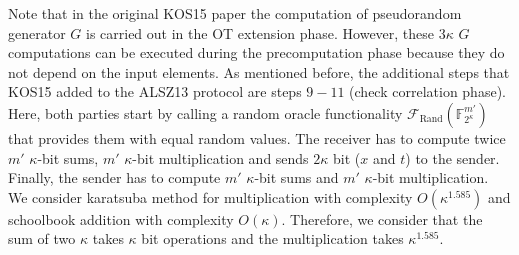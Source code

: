 Note that in the original KOS15 paper \cite{K15} the computation of pseudorandom generator $G$ is carried out in the OT extension phase. However, these $3\kappa$ $G$ computations can be executed during the precomputation phase because they do not depend on the input elements. As mentioned before, the additional steps that KOS15 added to the ALSZ13 protocol are steps $9-11$ (check correlation phase). Here, both parties start by calling a random oracle functionality $\mathcal{F}_{\text{Rand}}(\mathbb{F}^{m'}_{2^\kappa})$ that provides them with equal random values. The receiver has to compute twice $m'$ $\kappa$-bit sums, $m'$ $\kappa$-bit multiplication and sends $2\kappa$ bit ($x$ and $t$) to the sender. Finally, the sender has to compute $m'$ $\kappa$-bit sums and $m'$ $\kappa$-bit multiplication. We consider karatsuba method for multiplication with complexity $O(\kappa^{1.585})$ and schoolbook addition with complexity $O(\kappa)$. Therefore, we consider that the sum of two $\kappa$ takes $\kappa$ bit operations and the multiplication takes $\kappa^{1.585}$.




